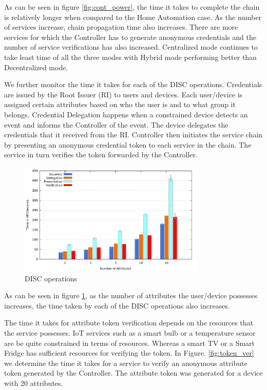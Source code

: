 \documentclass[journal]{IEEEtran}
\begin{document}
As can be seen in figure \ref{fig:cont_power}, the time it takes to complete the chain is relatively longer when compared to the Home Automation case. As the number of services increase, chain propagation time also increases. There are more services for which the Controller has to generate anonymous credentials and the number of service verifications has also increased. Centralized mode continues to take least time of all the three modes with Hybrid mode performing better than Decentralized mode.

We further monitor the time it takes for each of the DISC operations. Credentials are issued by the Root Issuer (RI) to users and devices. Each user/device is assigned certain attributes based on who the user is and to what group it belongs. Credential Delegation happens when a constrained device detects an event and informs the Controller of the event. The device delegates the credentials that it received from the RI. Controller then initiates the service chain by presenting an anonymous credential token to each service in the chain. The service in turn verifies the token forwarded by the Controller.

\begin{figure}[htbp]
\centerline{\includegraphics[width=3.5in]{operations.pdf}}
\caption{DISC operations}
\label{fig:disc_op}
\end{figure}

As can be seen in figure \ref{fig:disc_op}, as the number of attributes the user/device possesses increases, the time taken by each of the DISC operations also increases.

The time it takes for attribute token verification depends on the resources that the service possesses. IoT services such as a smart bulb or a temperature sensor are be quite constrained in terms of resources. Whereas a smart TV or a Smart Fridge has sufficient resources for verifying the token. In Figure. \ref{fig:token_ver} we determine the time it takes for a service to verify an anonymous attribute token generated by the Controller. The attribute token was generated for a device with 20 attributes.
\end{document}
